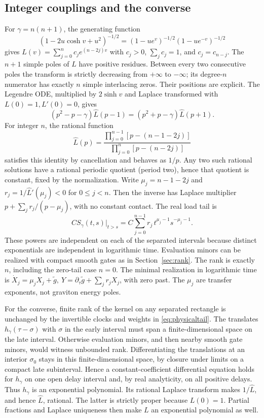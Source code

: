 \subsection{Integer couplings and the converse}
For \(\gamma=n(n+1)\), the generating function
\[
 (1-2u\cosh v+u^2)^{-1/2}
       =(1-u e^v)^{-1/2}(1-u e^{-v})^{-1/2}
\]
gives \(L(v)=\sum_{j=0}^n c_j e^{(n-2j)v}\) with \(c_j>0\), \(\sum_j c_j=1\), and \(c_j=c_{n-j}\). The \(n+1\) simple poles of \(\widehat L\) have positive residues. Between every two consecutive poles the transform is strictly decreasing from \(+\infty\) to \(-\infty\); its degree-\(n\) numerator has exactly \(n\) simple interlacing zeros. Their positions are explicit. The Legendre ODE, multiplied by \(2\sinh v\) and Laplace transformed with \(L(0)=1,L'(0)=0\), gives
\[
 (p^2-p-\gamma)\widehat L(p-1)=(p^2+p-\gamma)\widehat L(p+1).
\]
For integer \(n\), the rational function
\begin{equation}
 \widehat L(p)=
   \frac{\displaystyle\prod_{j=0}^{n-1}[p-(n-1-2j)]}
        {\displaystyle\prod_{j=0}^n[p-(n-2j)]}
 \label{eq:rational}
\end{equation}
satisfies this identity by cancellation and behaves as \(1/p\). Any two such rational solutions have a rational periodic quotient (period two), hence that quotient is constant, fixed by the normalization. Write \(\mu_j=n-1-2j\) and \(r_j=1/\widehat L'(\mu_j)<0\) for \(0\le j<n\). Then the inverse has Laplace multiplier \(p+\sum_j r_j/(p-\mu_j)\), with no constant contact. The real load tail is
\begin{equation}
       CS_\gamma(t,s)\big|_{t>s}=C\sum_{j=0}^{n-1}r_j\,t^{\mu_j-1}s^{-\mu_j-1}.
 \label{eq:laddertail}
\end{equation}
These powers are independent on each of the separated intervals because distinct exponentials are independent in logarithmic time. Evaluation minors can be realized with compact smooth gates as in Section~\ref{sec:rank}. The rank is exactly \(n\), including the zero-tail case \(n=0\). The minimal realization in logarithmic time is \(\dot X_j=\mu_j X_j+\widetilde g,\ Y=\partial_\tau\widetilde g+\sum_j r_j X_j\), with zero past. The \(\mu_j\) are transfer exponents, not graviton energy poles.

For the converse, finite rank of the kernel on any separated rectangle is unchanged by the invertible clocks and weights in \eqref{eq:physicaltail}. The translates \(h_\gamma(\tau-\sigma)\) with \(\sigma\) in the early interval must span a finite-dimensional space on the late interval. Otherwise evaluation minors, and then nearby smooth gate minors, would witness unbounded rank. Differentiating the translations at an interior \(\sigma_0\) stays in this finite-dimensional space, by closure under limits on a compact late subinterval. Hence a constant-coefficient differential equation holds for \(h_\gamma\) on one open delay interval and, by real analyticity, on all positive delays. Thus \(h_\gamma\) is an exponential polynomial. Its rational Laplace transform makes \(1/\widehat L\), and hence \(\widehat L\), rational. The latter is strictly proper because \(L(0)=1\). Partial fractions and Laplace uniqueness then make \(L\) an exponential polynomial as well.

